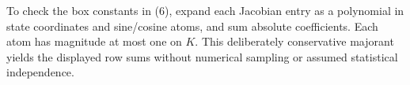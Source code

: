 \documentclass[10pt,a4paper]{article}
\begin{document}
To check the box constants in (6), expand each Jacobian entry as a polynomial in state coordinates and sine/cosine atoms, and sum absolute coefficients. Each atom has magnitude at most one on $K$. This deliberately conservative majorant yields the displayed row sums without numerical sampling or assumed statistical independence.
\end{document}
